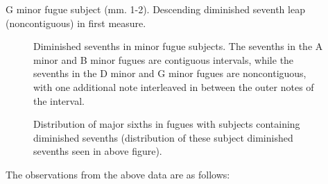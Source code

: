 \begin{Example}[H]
\vspace{1.5em}
    \centering
    \caption[Diminished seventh leap (noncontiguous) in g minor fugue subject (mm. 1-2). ]{ G minor fugue subject (mm. 1-2). Descending diminished seventh leap (noncontiguous) in first measure.}
\end{Example}    




\begin{figure}[H]
\vspace{1.5em}
    \centering
    \caption[Diminished sevenths in minor fugue subjects. ]{Diminished sevenths in minor fugue subjects. The sevenths in the A minor and B minor fugues are contiguous intervals, while the sevenths in the D minor and G minor fugues are noncontiguous, with one additional note interleaved in between the outer notes of the interval.}
\end{figure}

\begin{figure}[H]
\vspace{1.5em}
    \centering
    \caption[Distribution of major sixths in fugues with subjects containing diminished sevenths. ]{Distribution of major sixths in fugues with subjects containing diminished sevenths (distribution of these subject diminished sevenths seen in above figure).}
\end{figure}    The observations from the above data are as follows:

